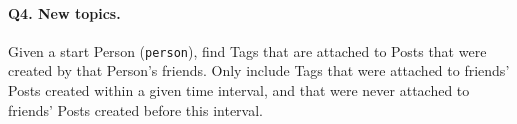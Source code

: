 \paragraph{\textbf{Q4}. New topics.}
Given a start Person (\texttt{person}), find Tags that are attached to
Posts that were created by that Person's friends. Only include Tags that
were attached to friends' Posts created within a given time interval,
and that were never attached to friends' Posts created before this
interval.
